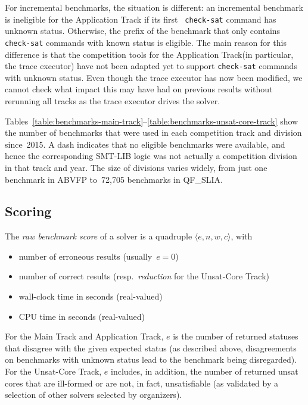 \documentclass[dvipsnames,table,twoside,11pt]{article}
\newcommand{\maintrack}{Main Track\xspace}
\newcommand{\apptrack}{Application Track\xspace}
\newcommand{\ucoretrack}{Unsat-Core Track\xspace}
\begin{document}
For incremental benchmarks, the situation is different: an incremental
benchmark is ineligible for the \apptrack if its first {\tt
  check-sat} command has unknown status.  Otherwise, the prefix of the
benchmark that only contains {\tt check-sat} commands with known
status is eligible.  The main reason for this difference is that the
competition tools for the \apptrack (in particular, the trace
executor) have not been adapted yet to support {\tt check-sat}
commands with unknown status. Even though the trace executor has now been modified, we cannot check what impact this may have had on previous results without rerunning all tracks as the trace executor drives the solver.

Tables~\ref{table:benchmarks-main-track}--\ref{table:benchmarks-unsat-core-track}
show the number of benchmarks that were used in each competition track
and division since~2015.  A dash indicates that no eligible benchmarks
were available, and hence the corresponding SMT-LIB logic was not
actually a competition division in that track and year.  The size of
divisions varies widely, from just one benchmark in ABVFP to~72,705
benchmarks in QF\_SLIA.

\subsection{Scoring}

The \emph{raw benchmark score} of a solver is a quadruple $\langle
e, n, w, c\rangle$, with
\begin{itemize}[noitemsep]
  \item {} number of erroneous results (usually~$e = 0$)
  \item {} number of correct results (resp.~\emph{reduction} for the \ucoretrack)
  \item {} wall-clock time in seconds (real-valued)
  \item {} CPU time in seconds (real-valued)
\end{itemize}
\noindent
For the \maintrack and \apptrack, $e$ is the number of returned statuses that disagree with the given expected status (as described above, disagreements on benchmarks with unknown status lead to the benchmark being disregarded). For the \ucoretrack, $e$ includes, in addition, the number of returned unsat cores that are ill-formed or are not, in fact, unsatisfiable (as validated by a selection of other solvers selected by organizers).
\end{document}
